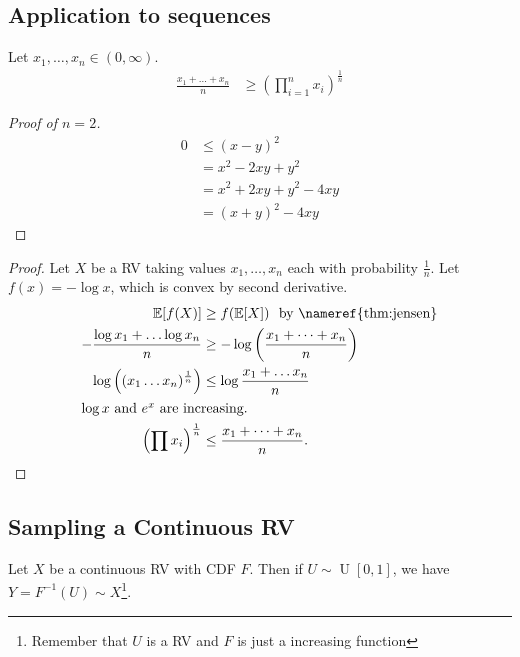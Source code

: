 \subsection{Application to sequences}
\begin{definition}[AM - GM inequality]
    Let $x_1, \dots, x_n \in (0, \infty)$.
    \begin{align*}
        \frac{x_1 + \dots + x_n}{n} &\geq \left( \prod^n_{i = 1} x_i \right)^{\frac{1}{n}}
    \end{align*} 
\end{definition} 

\begin{proof}[Proof of $n = 2$]
    \begin{align*}
        0 &\leq (x - y)^2  \\
        &= x^2 - 2xy + y^2 \\
        &= x^2 + 2 xy + y^2 - 4xy \\
        &= (x + y)^2 - 4xy
    \end{align*} 
\end{proof} 

\begin{proof}
    Let $X$ be a RV taking values ${x_1, \dots, x_n}$ each with probability $\frac{1}{n}$.
    Let $f(x) = - \log x$, which is convex by second derivative.
    \begin{align*}
        \mathbb{E}[f(X)] &\geq f(\mathbb{E}[X]) \ \text{ by \nameref{thm:jensen}} \\
        - \frac{\log x_1 + \dots \log x_n}{n} &\geq - \log \left( \frac{x_1 + \dots + x_n}{n} \right) \\
        \log \left( (x_1 \dots x_n)^{\frac{1}{n}} \right) &\leq \log \frac{x_1 + \dots x_n}{n} \\
        \intertext{$\log x$ and $e^x$ are increasing.}
        \left( \prod x_i \right)^{\frac{1}{n}} &\leq \frac{x_1 + \dots + x_n}{n}.
    \end{align*} 
\end{proof} 

\subsection{Sampling a Continuous RV}

\begin{theorem}
    Let $X$ be a continuous RV with CDF $F$.
    Then if $U \sim \operatorname{U}[0, 1]$, we have $Y = F^{-1}(U) \sim X$\footnote{Remember that $U$ is a RV and $F$ is just a increasing function}.
\end{theorem} 


